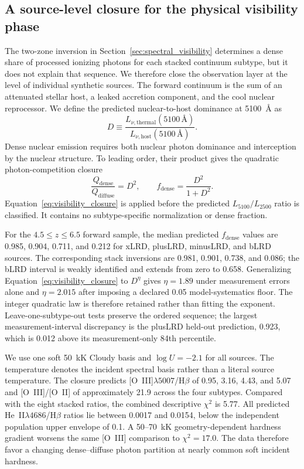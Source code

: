 \subsection{A source-level closure for the physical visibility phase}
\label{sec:physical_visibility_closure}

The two-zone inversion in Section~\ref{sec:spectral_visibility} determines a
dense share of processed ionizing photons for each stacked continuum subtype,
but it does not explain that sequence. We therefore close the observation
layer at the level of individual synthetic sources. The forward continuum is
the sum of an attenuated stellar host, a leaked accretion component, and the
cool nuclear reprocessor. We define the predicted nuclear-to-host dominance
at 5100~\AA{} as
\begin{equation}
  D \equiv
  \frac{L_{\nu,\mathrm{thermal}}(5100\,\text{\AA})}
       {L_{\nu,\mathrm{host}}(5100\,\text{\AA})}.
\end{equation}
Dense nuclear emission requires both nuclear photon dominance and
interception by the nuclear structure. To leading order, their product gives
the quadratic photon-competition closure
\begin{equation}
  \frac{Q_{\mathrm{dense}}}{Q_{\mathrm{diffuse}}}=D^2,
  \qquad
  f_{\mathrm{dense}}=\frac{D^2}{1+D^2}.
  \label{eq:visibility_closure}
\end{equation}
Equation~\ref{eq:visibility_closure} is applied before the predicted
$L_{5100}/L_{2500}$ ratio is classified. It contains no subtype-specific
normalization or dense fraction.

For the $4.5\leq z\leq6.5$ forward sample, the median predicted
$f_{\mathrm{dense}}$ values are 0.985, 0.904, 0.711, and 0.212 for xLRD,
plusLRD, minusLRD, and bLRD sources. The corresponding stack inversions are
0.981, 0.901, 0.738, and 0.086; the bLRD interval is weakly identified and
extends from zero to 0.658. Generalizing Equation~\ref{eq:visibility_closure}
to $D^\eta$ gives $\eta=1.89$ under measurement errors alone and
$\eta=2.015$ after imposing a declared 0.05 model-systematics floor. The
integer quadratic law is therefore retained rather than fitting the exponent.
Leave-one-subtype-out tests preserve the ordered sequence; the largest
measurement-interval discrepancy is the plusLRD held-out prediction, 0.923,
which is 0.012 above its measurement-only 84th percentile.

We use one soft 50~kK Cloudy basis and $\log U=-2.1$ for all sources. The
temperature denotes the incident spectral basis rather than a literal source
temperature. The closure predicts [O~III]$\lambda5007$/H$\beta$ of 0.95,
3.16, 4.43, and 5.07 and [O~III]/[O~II] of approximately 21.9 across the four
subtypes. Compared with the eight stacked ratios, the combined descriptive
$\chi^2$ is 5.77. All predicted He~II$\lambda4686$/H$\beta$ ratios lie between
0.0017 and 0.0154, below the independent population upper envelope of 0.1.
A 50--70~kK geometry-dependent hardness gradient worsens the same
[O~III] comparison to $\chi^2=17.0$. The data therefore favor a changing
dense--diffuse photon partition at nearly common soft incident hardness.

